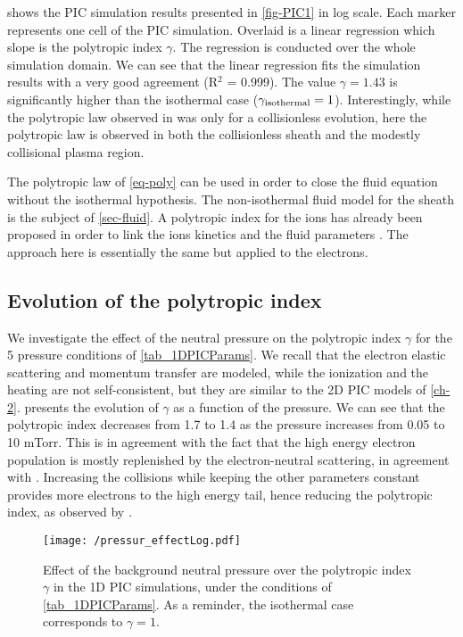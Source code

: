      shows the PIC simulation results presented in \cref{fig-PIC1} in log scale.
    Each marker represents one cell of the PIC simulation.
    Overlaid is a linear regression which slope is the polytropic index $\gamma$.
    The regression is conducted over the whole simulation domain.
    We can see that the linear regression fits the simulation results with a very good agreement (R$^2$ = 0.999).
    The value $\gamma = 1.43$ is significantly higher than the isothermal case ($\gamma_{\rm isothermal} = 1$).
    Interestingly, while the polytropic law observed in \citet{zhang2016} was only for a collisionless evolution, here the polytropic law is observed in both the collisionless sheath and the modestly collisional plasma region.

    The polytropic law of \cref{eq-poly} can be used in order to close the fluid equation without the isothermal hypothesis.
    The non-isothermal fluid model for the sheath is the subject of \cref{sec-fluid}.
    A polytropic index for the ions has already been proposed in order to link the ions kinetics and the fluid parameters \citep{kuhn2006,jelic2007}.
    The approach here is essentially the same but applied to the electrons.


  \subsection{Evolution of the polytropic index}
    \label{subsec-presurseffect}
    We investigate the effect of the neutral pressure on the polytropic index $\gamma$ for the 5 pressure conditions of \cref{tab_1DPICParams}.
    We recall that the electron elastic scattering and momentum transfer are modeled, while the ionization and the heating are not self-consistent, but they are similar to the \ac{2D} \ac{PIC} models of \cref{ch-2}.
     presents the evolution of $\gamma$ as a function of the pressure.
    We can see that the polytropic index decreases from 1.7 to 1.4 as the pressure increases from 0.05 to 10 mTorr.
    This is in agreement with the fact that the high energy electron population is mostly replenished by the electron-neutral scattering, in agreement with \citet{kaganovich2007}.
    Increasing the collisions while keeping the other parameters constant provides more electrons to the high energy tail, hence reducing the polytropic index, as observed by \citet{zhang2016}.

    \begin{figure}[!htbp]
      \centering
      \texttt{[image: /pressur\_effectLog.pdf]}
      \caption{Effect of the background neutral pressure over the polytropic index $\gamma$ in the \ac{1D} \ac{PIC} simulations, under the conditions of \cref{tab_1DPICParams}. As a reminder, the isothermal case corresponds to $\gamma=1$.}
      \label{fig-p}
    \end{figure}

